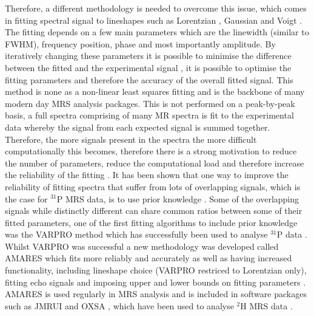 Therefore, a different methodology is needed to overcome this issue, which comes in fitting spectral signal to lineshapes such as Lorentzian \cite{Lorentz1895TheHeat}, Gaussian and Voigt \cite{Near2021PreprocessingRecommendations}. The fitting depends on a few main parameters which are the linewidth (similar to \ac{FWHM}), frequency position, phase and most importantly amplitude. By iteratively changing these parameters it is possible to minimise the difference between the fitted and the experimental signal \cite{Vanhamme2001MRMethods}, it is possible to optimise the fitting parameters and therefore the accuracy of the overall fitted signal. This method is none as a non-linear least squares \cite{Golub1973TheSeparate} fitting and is the backbone of many modern day \ac{MRS} analysis packages. This is not performed on a peak-by-peak basis, a full spectra comprising of many MR spectra is fit to the experimental data whereby the signal from each expected signal is summed together. Therefore, the more signals present in the spectra the more difficult computationally this becomes, therefore there is a strong motivation to reduce the number of parameters, reduce the computational load and therefore increase the reliability of the fitting \cite{Near2021PreprocessingRecommendations}. It has been shown that one way to improve the reliability of fitting spectra that suffer from lots of overlapping signals, which is the case for $^{31}$P \ac{MRS} data, is to use prior knowledge \cite{Hamilton2003PriorSpectra}. Some of the overlapping signals while distinctly different can share common ratios between some of their fitted parameters, one of the first fitting algorithms to include prior knowledge was the \ac{VARPRO} method \cite{Golub1973TheSeparate} which has successfully been used to analyse $^{31}$P data \cite{vanderVeen1988AccurateKnowledge,Stubbs199631P-MagneticADP}. Whilst \ac{VARPRO} was successful a new methodology was developed called \ac{AMARES} which fits more reliably and accurately as well as having increased functionality, including lineshape choice (VARPRO restriced to Lorentzian only), fitting echo signals and imposing upper and lower bounds on fitting parameters \cite{Vanhamme1997ImprovedKnowledge}. \ac{AMARES} is used regularly in \ac{MRS} analysis and is included in software packages such as JMRUI \cite{Stefan2009QuantitationPackage} and OXSA \cite{Purvis2017OXSA:MATLAB}, which have been used to analyse $^2$H \ac{MRS} data \cite{Simoes2022GlucoseGlioblastoma,Kreis2020MeasuringMRI,Kaggie2022DeuteriumMetabolism}. 

